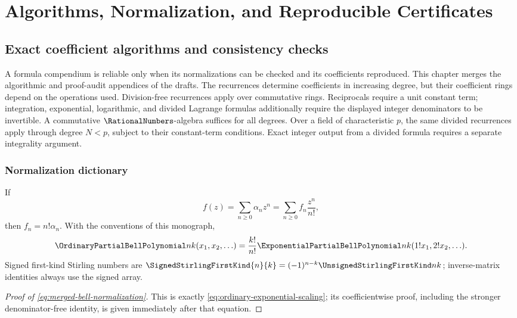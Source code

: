 \documentclass[11pt,a4paper,oneside,openany]{book}
\theoremstyle{definition}
\theoremstyle{remark}
\begin{document}
\part{Algorithms, Normalization, and Reproducible Certificates}

\chapter{Exact coefficient algorithms and consistency checks}
\label{ch:merged-algorithms}

A formula compendium is reliable only when its normalizations can be checked
and its coefficients reproduced.  This chapter merges the algorithmic and
proof-audit appendices of the drafts.  The recurrences determine coefficients
in increasing degree, but their coefficient rings depend on the operations
used.  Division-free recurrences apply over commutative rings.  Reciprocals
require a unit constant term; integration, exponential, logarithmic, and
divided Lagrange formulas additionally require the displayed integer
denominators to be invertible.  A commutative $\RationalNumbers$-algebra
suffices for all degrees.  Over a field of characteristic $p$, the same
divided recurrences apply through degree $N<p$, subject to their constant-term
conditions.  Exact integer output from a divided formula requires a separate
integrality argument.

\section{Normalization dictionary}

\begin{auditbox}[title={Ordinary versus exponential coefficients}]
If
\[
 f(z)=\sum_{n\geq0}\alpha_nz^n
     =\sum_{n\geq0}f_n\frac{z^n}{n!},
\]
then $f_n=n!\alpha_n$.  With the conventions of this monograph,
\begin{equation}
 \OrdinaryPartialBellPolynomial nk(x_1,x_2,\ldots)
 =\frac{k!}{n!}\ExponentialPartialBellPolynomial nk(1!x_1,2!x_2,\ldots).                      \label{eq:merged-bell-normalization}
\end{equation}
Signed first-kind Stirling numbers are
$\SignedStirlingFirstKind{n}{k}=(-1)^{n-k}\UnsignedStirlingFirstKind nk$; inverse-matrix identities always use the
signed array.
\end{auditbox}

\begin{proof}[Proof of \eqref{eq:merged-bell-normalization}]
This is exactly \eqref{eq:ordinary-exponential-scaling}; its coefficientwise
proof, including the stronger denominator-free identity, is given immediately
after that equation.
\end{proof}
\end{document}

